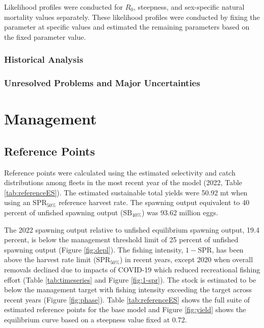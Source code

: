 \documentclass[11pt,
  english,
  letterpaper,
]{article}
\begin{document}
Likelihood profiles were conducted for \(R_0\), steepness, and sex-specific natural mortality values separately. These likelihood profiles were conducted by fixing the parameter at specific values and estimated the remaining parameters based on the fixed parameter value.

\hypertarget{historical-analysis}{%
\subsubsection{Historical Analysis}\label{historical-analysis}}

\hypertarget{unresolved-problems-and-major-uncertainties-1}{%
\subsubsection{Unresolved Problems and Major Uncertainties}\label{unresolved-problems-and-major-uncertainties-1}}

\hypertarget{management}{%
\section{Management}\label{management}}

\hypertarget{reference-points-2}{%
\subsection{Reference Points}\label{reference-points-2}}

Reference points were calculated using the estimated selectivity and catch distributions among fleets in the most recent year of the model (2022, Table \ref{tab:referenceES}). The estimated sustainable total yields were 50.92 mt when using an \(\text{SPR}_{50\%}\) reference harvest rate. The spawning output equivalent to 40 percent of unfished spawning output (\(\text{SB}_{40\%}\)) was 93.62 million eggs.

The 2022 spawning output relative to unfished equilibrium spawning output, 19.4 percent, is below the management threshold limit of 25 percent of unfished spawning output (Figure \ref{fig:depl}). The fishing intensity, \(1-\text{SPR}\), has been above the harvest rate limit (\(\text{SPR}_{50\%}\)) in recent years, except 2020 when overall removals declined due to impacts of COVID-19 which reduced recreational fishing effort (Table \ref{tab:timeseries} and Figure \ref{fig:1-spr}). The stock is estimated to be below the management target with fishing intensity exceeding the target across recent years (Figure \ref{fig:phase}). Table \ref{tab:referenceES} shows the full suite of estimated reference points for the base model and Figure \ref{fig:yield} shows the equilibrium curve based on a steepness value fixed at 0.72.
\end{document}
